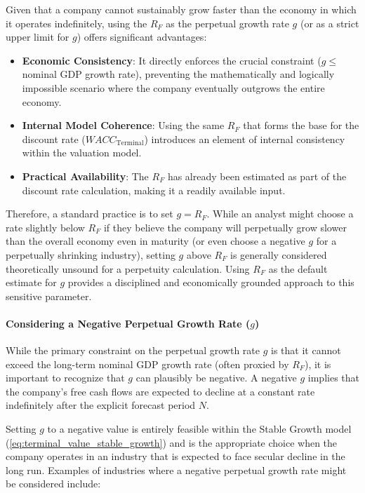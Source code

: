 Given that a company cannot sustainably grow faster than the economy in which it operates indefinitely, using the \(R_F\) as the perpetual growth rate \(g\) (or as a strict upper limit for \(g\)) offers significant advantages:
\begin{itemize}
    \item \textbf{Economic Consistency}: It directly enforces the crucial constraint (\(g \le\) nominal GDP growth rate), preventing the mathematically and logically impossible scenario where the company eventually outgrows the entire economy.
    \item \textbf{Internal Model Coherence}: Using the same \(R_F\) that forms the base for the discount rate (\(WACC_{\text{Terminal}}\)) introduces an element of internal consistency within the valuation model.
    \item \textbf{Practical Availability}: The \(R_F\) has already been estimated as part of the discount rate calculation, making it a readily available input.
\end{itemize}

Therefore, a standard practice is to set \(g = R_F\). While an analyst might choose a rate slightly below \(R_F\) if they believe the company will perpetually grow slower than the overall economy even in maturity (or even choose a negative \(g\) for a perpetually shrinking industry), setting \(g\) above \(R_F\) is generally considered theoretically unsound for a perpetuity calculation. Using \(R_F\) as the default estimate for \(g\) provides a disciplined and economically grounded approach to this sensitive parameter.

\paragraph{Considering a Negative Perpetual Growth Rate (\(g\))} \label{par:negative_g}
While the primary constraint on the perpetual growth rate \(g\) is that it cannot exceed the long-term nominal GDP growth rate (often proxied by \(R_F\)), it is important to recognize that \(g\) can plausibly be negative. A negative \(g\) implies that the company's free cash flows are expected to decline at a constant rate indefinitely after the explicit forecast period \(N\).

Setting \(g\) to a negative value is entirely feasible within the Stable Growth model (\ref{eq:terminal_value_stable_growth}) and is the appropriate choice when the company operates in an industry that is expected to face secular decline in the long run. Examples of industries where a negative perpetual growth rate might be considered include:

